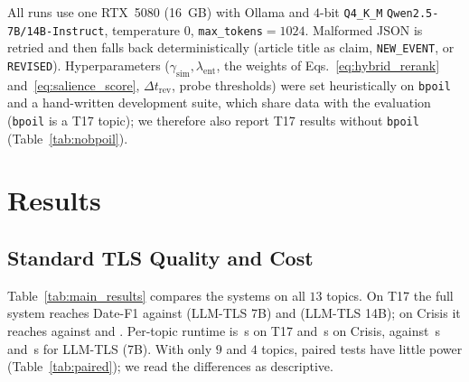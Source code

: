 \documentclass[journal]{IEEEtran}
\begin{document}
All runs use one RTX~5080 (16~GB) with Ollama and $4$-bit \texttt{Q4\_K\_M} \texttt{Qwen2.5-7B/14B-Instruct}, temperature $0$, \texttt{max\_tokens}$=1024$. Malformed JSON is retried and then falls back deterministically (article title as claim, \texttt{NEW\_EVENT}, or \texttt{REVISED}). Hyperparameters ($\gamma_{\text{sim}},\lambda_{\text{ent}}$, the weights of Eqs.~\ref{eq:hybrid_rerank} and~\ref{eq:salience_score}, $\Delta t_{\text{rev}}$, probe thresholds) were set heuristically on \texttt{bpoil} and a hand-written development suite, which share data with the evaluation (\texttt{bpoil} is a T17 topic); we therefore also report T17 results without \texttt{bpoil} (Table~\ref{tab:nobpoil}).

\section{Results}
\label{sec:results}

\subsection{Standard TLS Quality and Cost}
\label{subsec:main_results}

\begin{table}[t]
\centering
\caption{Full-corpus results on T17 and Crisis, mean $\pm$ std over topics of per-topic scores averaged over reference timelines. Time is mean seconds per topic. Best \textbf{bold}, second best \underline{underlined}. AR/Concat are our reimplementation (Section~\ref{subsec:metrics}).}
\label{tab:main_results}
\renewcommand{\arraystretch}{1.12}
\resizebox{\textwidth}{!}{}
\end{table}

Table~\ref{tab:main_results} compares the systems on all $13$ topics. On T17 the full system reaches Date-F1 \DateFTDual{} against \DateFTLSeven{} (LLM-TLS 7B) and \DateFTLFourteen{} (LLM-TLS 14B); on Crisis it reaches \DateFCDual{} against \DateFCLSeven{} and \DateFCLFourteen{}. Per-topic runtime is \TimeTDual{}\,s on T17 and \TimeCDual{}\,s on Crisis, against \TimeTLSeven{}\,s and \TimeCLSeven{}\,s for LLM-TLS (7B). With only $9$ and $4$ topics, paired tests have little power (Table~\ref{tab:paired}); we read the differences as descriptive.

\end{document}
